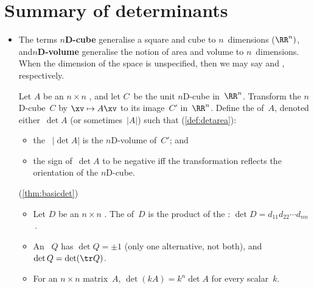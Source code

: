 
\section{Summary of determinants}
\label{sec:sumd}


\begin{itemize}
\def\index#1{}%

\itemhi The `graphical formula'~\eqref{eq:dets23b} for \(2\times2\) and \(3\times3\) determinants are useful for both theory and many practical small problems.


\subsubsection*{Geometry underlies determinants}

\item The terms \index{nD-cube@$n$D-cube|textbf}\textbf{$n$D-cube}  generalise a square and cube to \(n\)~dimensions (\(\RR^n)\), and\index{nD-volume@$n$D-volume|textbf}\textbf{$n$D-volume} generalise the notion of area and volume to \(n\)~dimensions.
When the dimension of the space is unspecified, then we may say  and , respectively.

\itemhi Let \(A\) be an \(n\times n\) , and let \(C\)~be the unit \index{nD-cube@$n$D-cube}$n$D-cube in~\(\RR^n\).
Transform the \(n\)D-cube~\(C\) by \(\xv\mapsto A\xv\) to its image~\(C'\) in~\(\RR^n\). 
Define the  of~\(A\), denoted either~\(\det A\) (or sometimes~\(|A|\)) such that (\autoref{def:detarea}):  \begin{itemize}
\item the ~\(|\det A|\) is the \index{nD-volume@$n$D-volume}$n$D-volume of~\(C'\); and 
\item the sign of~\(\det A\) to be negative iff the transformation reflects the orientation of the $n$D-cube.
\end{itemize}

\itemhi (\autoref{thm:basicdet})
\begin{itemize}
\item   Let \(D\) be an \(n\times n\) .
The  of~\(D\) is the product of the : \(\det D=d_{11}d_{22}\cdots d_{nn}\)\,.
\item  An ~\(Q\) has  \(\det Q=\pm1\) (only one alternative, not both), and \(\det Q=\det(\tr Q)\).
\item   For an \(n\times n\) matrix~\(A\), \(\det(kA)=k^n\det A\) for every scalar~\(k\).
\end{itemize}


\end{itemize}
